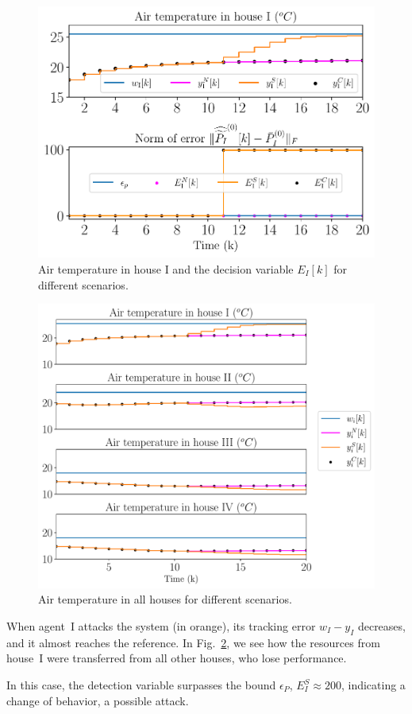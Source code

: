 \documentclass[../main.tex]{subfiles}
\begin{document}
\begin{figure}[h]
  \centering
 \includegraphics[width=.7\textwidth,trim=0 .3cm 0 .2cm,clip]{../img/resilient_ineq/ErrorWX_command_normErrH.pdf}
  \caption{Air temperature in house I and the decision variable $E_{I}[k]$ for different scenarios.}\label{fig:response3Scenarios}
\end{figure}
\begin{figure}[h]
  \centering
 \includegraphics[width=.7\textwidth,trim=0 .3cm 0 .2cm,clip]{../img/resilient_ineq/ErrorWX_command_normErrH_all_houses.pdf}
  \caption{Air temperature in all houses for different scenarios.}\label{fig:response3Scenarios_all_houses}
\end{figure}

When agent~I attacks the system (in orange), its tracking error
${w_{I}-y_{I}}$ decreases, and it almost reaches the reference.
In Fig.~\ref{fig:response3Scenarios_all_houses}, we see how the resources from house~I were transferred from all other houses, who lose performance.

In this case, the detection variable surpasses the bound $\epsilon_{P}$,
${E_{I}^{S}\approx200}$, indicating a change of behavior, a possible attack.
\end{document}
